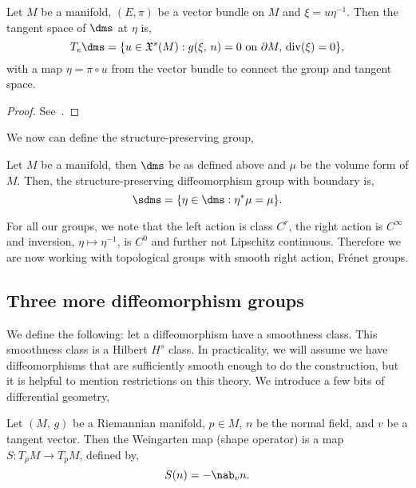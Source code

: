 \begin{nlemma}
  Let $M$ be a manifold, $(E, \pi)$ be a vector bundle on $M$ and $\xi = u\eta^{-1}$. Then the tangent space of $\dms$ at $\eta$ is,
  $$ T_e\dms = \{u \in \mathfrak{X}^s(M) : g(\xi,\, n) = 0 \text{ on }\partial M,\, \mathrm{div}(\xi) = 0\}, $$
  with a map $\eta = \pi \circ u$ from the vector bundle to connect the group and tangent space.
\end{nlemma}
\begin{proof}
  See~\cite{diffeost}.
\end{proof}

\noindent
We now can define the structure-preserving group,
\begin{ndefi}
  Let $M$ be a manifold, then $\dms$ be as defined above and $\mu$ be the volume form of $M$. Then, the structure-preserving diffeomorphism group with boundary is,
  $$ \sdms = \{\eta \in \dms : \eta^* \mu = \mu \}. $$
\end{ndefi}
\noindent
For all our groups, we note that the left action is class $C^r$, the right action is $C^\infty$ and inversion, $\eta \mapsto \eta^{-1}$, is $C^0$ and further not Lipschitz continuous. Therefore we are now working with topological groups with smooth right action, Fr\'enet groups.

\noindent
\subsection{Three more diffeomorphism groups}
We define the following: let a diffeomorphism have a smoothness class. This smoothness class is a Hilbert $ H^s$ class. In practicality, we will assume we have diffeomorphisms that are sufficiently smooth enough to do the construction, but it is helpful to mention restrictions on this theory. We introduce a few bits of differential geometry,
\begin{ndefi}
  Let $(M,\, g)$ be a Riemannian manifold, $p \in M$, $n$ be the normal field, and $v$ be a tangent vector. Then the Weingarten map (shape operator) is a map $S: T_pM \to T_pM$, defined by,
  $$ S(n) = -\nab_v n. $$
\end{ndefi}

